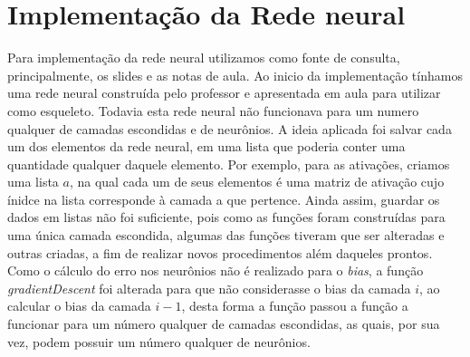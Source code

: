 \section{Implementação da Rede neural}
Para implementação da rede neural utilizamos como fonte de consulta, principalmente, os slides e as notas de aula. Ao inicio da implementação tínhamos uma rede neural construída pelo professor e apresentada em aula para utilizar como esqueleto. Todavia esta rede neural não funcionava para um numero qualquer de camadas escondidas e de neurônios. A ideia aplicada foi salvar cada um dos elementos da rede neural, em uma lista que poderia conter uma quantidade qualquer daquele elemento. Por exemplo, para as ativações, criamos uma lista $a$, na qual cada um de seus elementos é uma matriz de ativação cujo ínidce na lista corresponde à camada a que pertence. Ainda assim,  guardar os dados em listas não foi suficiente, pois como as funções  foram construídas para uma única camada escondida, algumas das funções tiveram que ser alteradas e outras criadas, a fim de realizar novos procedimentos além daqueles prontos. Como o cálculo do erro nos neurônios não é realizado para o \textit{bias}, a função \textit{gradientDescent} foi alterada para que não considerasse o bias da camada $i$, ao calcular o bias da camada $i-1$, desta forma a função passou a função a funcionar para um número qualquer de camadas escondidas, as quais, por sua vez, podem possuir um número qualquer de neurônios.